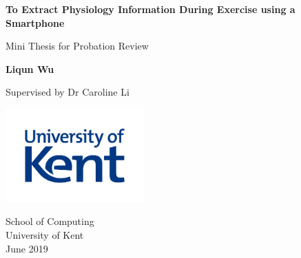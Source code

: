 \documentclass{report}
\begin{document}
\begin{titlepage}
    \begin{center}
 
        \Huge
        \textbf{To Extract Physiology Information During Exercise using a Smartphone}
 
        \LARGE
        Mini Thesis for Probation Review
 
        \vspace{0.5cm}

        \textbf{Liqun Wu}

        \Large
        Supervised by Dr Caroline Li
 
        \vfill
 
        \vspace{0.8cm}
 
        \includegraphics[width=0.4\textwidth]{figures/logo.jpg}
 
        \Large
        School of Computing\\
        University of Kent\\
        June 2019
 
    \end{center}
\end{titlepage}

\tableofcontents
\listoffigures







\printbibliography
\end{document}
